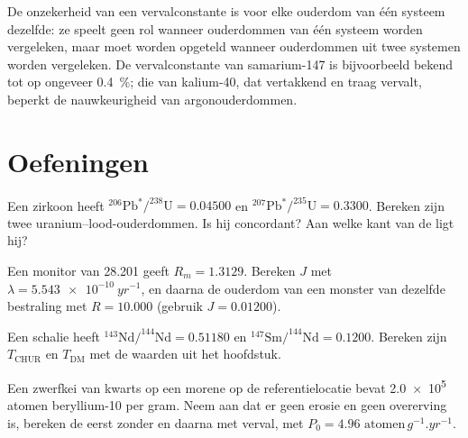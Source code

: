 De onzekerheid van een vervalconstante is voor elke ouderdom van één systeem dezelfde:
ze speelt geen rol wanneer ouderdommen van één systeem worden vergeleken, maar moet
worden opgeteld wanneer ouderdommen uit twee systemen worden vergeleken. De vervalconstante van samarium-147 is bijvoorbeeld
bekend tot op ongeveer \qty{0.4}{\percent}; die van kalium-40,
dat vertakkend en traag vervalt, beperkt de nauwkeurigheid van argonouderdommen.


\section{Oefeningen}

\begin{exercise}[$\star$]\label{exo:b3:advanced-geochronology:1}
Een zirkoon heeft $^{206}\mathrm{Pb}^*/^{238}\mathrm{U} = 0.04500$ en
$^{207}\mathrm{Pb}^*/^{235}\mathrm{U} = 0.3300$. Bereken zijn twee
uranium--lood-ouderdommen. Is hij concordant? Aan welke kant van de 
ligt hij?
\end{exercise}

\begin{exercise}[$\star$]\label{exo:b3:advanced-geochronology:2}
Een monitor van \qty{28.201}{\Ma} geeft $R_m = 1.3129$. Bereken $J$ met $\lambda
= \qty{5.543e-10}{yr^{-1}}$, en daarna de ouderdom van een monster van dezelfde bestraling
met $R = 10.000$ (gebruik $J = 0.01200$).
\end{exercise}

\begin{exercise}[$\star$]\label{exo:b3:advanced-geochronology:3}
Een schalie heeft $^{143}\mathrm{Nd}/^{144}\mathrm{Nd} = 0.51180$ en
$^{147}\mathrm{Sm}/^{144}\mathrm{Nd} = 0.1200$. Bereken zijn $T_{\mathrm{CHUR}}$
en $T_{\mathrm{DM}}$ met de waarden uit het hoofdstuk.
\end{exercise}

\begin{exercise}[$\star$]\label{exo:b3:advanced-geochronology:4}
Een zwerfkei van kwarts op een morene op de referentielocatie bevat \num{2.0e5}
atomen beryllium-10 per gram. Neem aan dat er geen erosie en geen overerving is,
bereken de  eerst zonder en daarna met verval, met $P_0 =
\num{4.96}\text{ atomen}\,\unit{g^{-1}.yr^{-1}}$.
\end{exercise}


